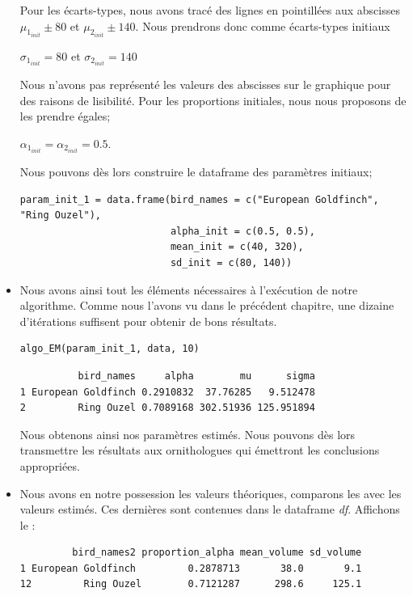 \documentclass[frenchb]{report}
\newcommand{\1}{\mathbbm{1}}
\theoremstyle{definition}\newtheorem{defn}{Définition}
\theoremstyle{definition}\newtheorem{exm}{Exemple}
\theoremstyle{definition}\newtheorem{nota}{Notation}
\theoremstyle{definition}\newtheorem{rem}{Remarque}
\begin{document}
\begin{itemize}[label=\adfflowerleft]
\begin{center}
\end{center}
Pour les écarts-types, nous avons tracé des lignes en pointillées aux abscisses $\mu_{1_{init}} \pm 80$ et $\mu_{2_{init}} \pm 140$. Nous prendrons donc comme écarts-types initiaux 
\begin{center}
$\sigma_{1_{init}} =  80$ et $\sigma_{2_{init}} = 140$
\end{center}
Nous n'avons pas représenté les valeurs des abscisses sur le graphique pour des raisons de lisibilité.\newline
Pour les proportions initiales, nous nous proposons de les prendre égales;  
\begin{center}
$\alpha_{1_{init}}=\alpha_{2_{init}}=0.5$.
\end{center}
Nous pouvons dès lors construire le dataframe des paramètres initiaux;

\begin{lstlisting}
param_init_1 = data.frame(bird_names = c("European Goldfinch", "Ring Ouzel"),
                          alpha_init = c(0.5, 0.5),
                          mean_init = c(40, 320),
                          sd_init = c(80, 140))

\end{lstlisting}

\item Nous avons ainsi tout les éléments nécessaires à l'exécution de notre algorithme. Comme nous l'avons vu dans le précédent chapitre, une dizaine d'itérations suffisent pour obtenir de bons résultats.

\begin{lstlisting}
algo_EM(param_init_1, data, 10)
\end{lstlisting}

\begin{verbatim}
          bird_names     alpha        mu      sigma
1 European Goldfinch 0.2910832  37.76285   9.512478
2         Ring Ouzel 0.7089168 302.51936 125.951894
\end{verbatim}
Nous obtenons ainsi nos paramètres estimés. Nous pouvons dès lors transmettre les résultats aux ornithologues qui émettront les conclusions appropriées. 

\item Nous avons en notre possession les valeurs théoriques, comparons les avec les valeurs estimés. Ces dernières sont contenues dans le dataframe \textit{df}. Affichons le :
\begin{verbatim}
         bird_names2 proportion_alpha mean_volume sd_volume
1 European Goldfinch         0.2878713       38.0       9.1
12         Ring Ouzel        0.7121287      298.6     125.1
\end{verbatim}


\end{itemize}
\end{document}
